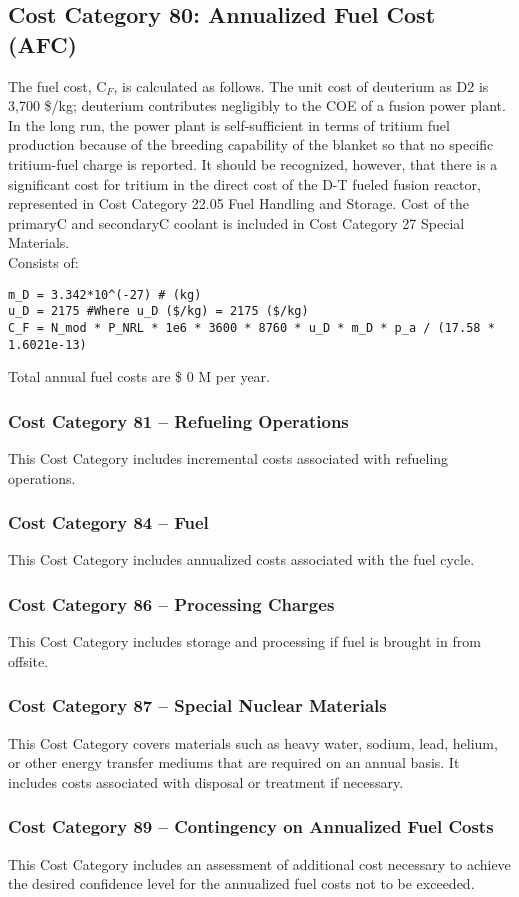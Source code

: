 \subsection{Cost Category 80: Annualized Fuel Cost (AFC)}

The fuel cost, C$_{F}$, is calculated as follows.  The unit cost of deuterium as D2 is 3,700 \$/kg; deuterium contributes negligibly to the COE of a fusion power plant. In the long run, the power plant is self-sufficient in terms of tritium fuel production because of the breeding capability of the blanket so that no specific tritium-fuel charge is reported. It should be recognized, however, that there is a significant cost for tritium in the direct cost of the D-T fueled fusion reactor, represented in Cost Category 22.05 Fuel Handling and Storage. Cost of the primaryC and secondaryC coolant is included in Cost Category 27 Special Materials.\\

Consists of:  
\begin{verbatim} 
m_D = 3.342*10^(-27) # (kg)
u_D = 2175 #Where u_D ($/kg) = 2175 ($/kg) 
C_F = N_mod * P_NRL * 1e6 * 3600 * 8760 * u_D * m_D * p_a / (17.58 * 1.6021e-13)
\end{verbatim} 

Total annual fuel costs are \$ 0 M per year.

\subsubsection*{Cost Category 81 – Refueling Operations}
This Cost Category includes incremental costs associated with refueling operations.

\subsubsection*{Cost Category 84 – Fuel}
This Cost Category includes annualized costs associated with the fuel cycle.

\subsubsection*{Cost Category 86 – Processing Charges}
This Cost Category includes storage and processing if fuel is brought in from offsite.

\subsubsection*{Cost Category 87 – Special Nuclear Materials}
This Cost Category covers materials such as heavy water, sodium, lead, helium, or other energy transfer mediums that are required on an annual basis. It includes costs associated with disposal or treatment if necessary. 

\subsubsection*{Cost Category 89 – Contingency on Annualized Fuel Costs}
This Cost Category includes an assessment of additional cost necessary to achieve the desired confidence level for the annualized fuel costs not to be exceeded.

